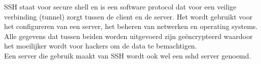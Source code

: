             SSH staat voor secure shell en is een software protocol dat voor een veilige verbinding (tunnel) zorgt tussen de client en de server. Het wordt gebruikt voor het configureren van een server, het beheren van netwerken en operating systems. Alle gegevens dat tussen beiden worden uitgevoerd zijn geëncrypteerd waardoor het moeilijker wordt voor hackers om de data te bemachtigen.\\
            Een server die gebruik maakt van SSH wordt ook wel een sshd server genoemd. 
%            
            
